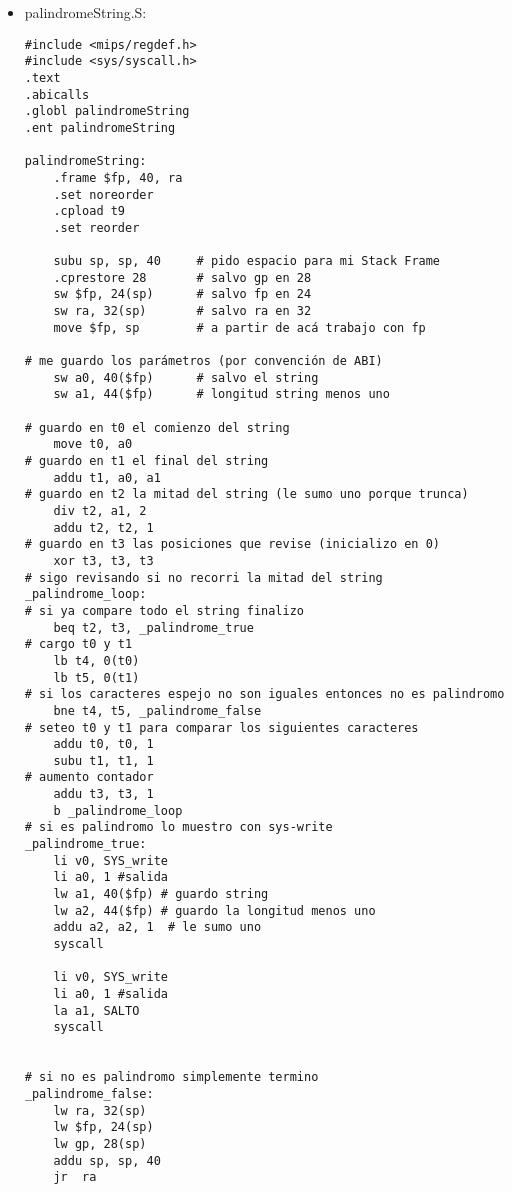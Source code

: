 \documentclass[a4paper,10pt]{article}
\begin{document}
\begin{itemize}
\begin{verbatim}
_lectura_inicial:
	b _rellenar_buffer

_return:
	lw ra, 32(sp)
	lw $fp, 24(sp)
	lw gp, 28(sp)
	addu sp, sp, 40
	jr	ra

.end getch

.data

AUX: .word 0
FDESCRIPTOR_DE_LECTURA: .word 0
FDESCRIPTOR_DE_ESCRITURA: .word 0
IBYTES: .word 0
OBYTES: .word 0
POS_INICIAL_IB: .word 0
POS_INICIAL_BUFF_PAL: .word 0

\end{verbatim}
\item palindromeString.S: \\
\begin{verbatim}
#include <mips/regdef.h>
#include <sys/syscall.h>
.text
.abicalls
.globl palindromeString
.ent palindromeString

palindromeString:
	.frame $fp, 40, ra
	.set noreorder
	.cpload t9
	.set reorder

	subu sp, sp, 40 	# pido espacio para mi Stack Frame
	.cprestore 28		# salvo gp en 28
	sw $fp, 24(sp)		# salvo fp en 24
	sw ra, 32(sp)		# salvo ra en 32
	move $fp, sp		# a partir de acá trabajo con fp
	
# me guardo los parámetros (por convención de ABI)
	sw a0, 40($fp)		# salvo el string
	sw a1, 44($fp)		# longitud string menos uno

# guardo en t0 el comienzo del string
	move t0, a0
# guardo en t1 el final del string
	addu t1, a0, a1
# guardo en t2 la mitad del string (le sumo uno porque trunca)
	div t2, a1, 2
	addu t2, t2, 1
# guardo en t3 las posiciones que revise (inicializo en 0)
	xor t3, t3, t3
# sigo revisando si no recorri la mitad del string
_palindrome_loop:
# si ya compare todo el string finalizo
	beq t2, t3, _palindrome_true
# cargo t0 y t1
	lb t4, 0(t0)
	lb t5, 0(t1)
# si los caracteres espejo no son iguales entonces no es palindromo
	bne t4, t5, _palindrome_false
# seteo t0 y t1 para comparar los siguientes caracteres	
	addu t0, t0, 1
	subu t1, t1, 1
# aumento contador
	addu t3, t3, 1
	b _palindrome_loop
# si es palindromo lo muestro con sys-write
_palindrome_true:
	li v0, SYS_write
	li a0, 1 #salida
	lw a1, 40($fp) # guardo string
	lw a2, 44($fp) # guardo la longitud menos uno
	addu a2, a2, 1	# le sumo uno
	syscall

	li v0, SYS_write
	li a0, 1 #salida
	la a1, SALTO
	syscall


# si no es palindromo simplemente termino
_palindrome_false:
	lw ra, 32(sp)
	lw $fp, 24(sp)
	lw gp, 28(sp)
	addu sp, sp, 40
	jr	ra


\end{verbatim}
\end{itemize}
\end{document}

